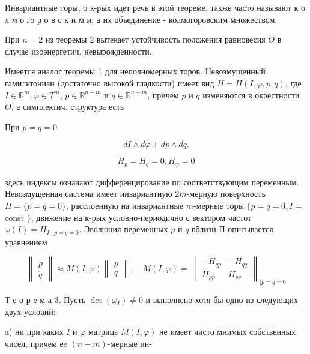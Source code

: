 \documentclass[10pt]{article}
\begin{document}
Инвариантные торы, о к-рых идет речь в этой теореме, также часто называют к о л м о го р о в с к и м и, а их объединение - колмогоровским множеством.



При $n=2$ из теоремы 2 вытекает устойчивость положения равновесия $O$ в случае изоэнергетич. невырожденности.



Имеется аналог теоремы 1 для неполномерных торов. Невозмущенный гамильтониан (достаточно высокой гладкости) имеет вид $H=H(I, \varphi, p, q)$, где $I \in \mathbb{R}^{m}, \varphi \in T^{m}$, $p \in \mathbb{R}^{n-m}$ и $q \in \mathbb{R}^{n-m}$, причем $p$ и $q$ изменяются в окрестности $O$, а симплектич. структура есть



При $p=q=0$



\[

d I \wedge d \varphi+d p \wedge d q .

\]



\[

H_{p}=H_{q}=0, H_{\varphi}=0

\]



здесь индексы означают дифференцирование по соответствующим переменным. Невозмущенная система имеет инвариантную $2 m$-мерную поверхность $\Pi=\{p=q=0\}$, расслоенную на инвариантные $m$-мерные торы $\{p=q=0, I=$ const $\}$, движение на к-рых условно-периодично с вектором частот $\omega(I)=H_{I \mid p=q=0}$. Эволюция переменных $p$ и $q$ вблизи П описывается уравнением



\[

\left\|\begin{array}{l}

\dot{p} \\

\dot{q}

\end{array}\right\| \approx M(I, \varphi)\left\|\begin{array}{l}

p \\

q

\end{array}\right\|, \quad M(I, \varphi)=\left\|\begin{array}{rr}

-H_{q p} & -H_{q q} \\

H_{p p} & H_{p q}

\end{array}\right\|_{\mid p=q=0}

\]



Т е о р е м а 3. Пусть $\operatorname{det}\left(\omega_{I}\right) \neq 0$ и выполнено хотя бы одно из следующих двух условий:



a) ни при каких $I$ и $\varphi$ матрица $M(I, \varphi)$ не имеет чисто мнимых собственных чисел, причем еe $(n-m)$-мерные ин-
\end{document}
